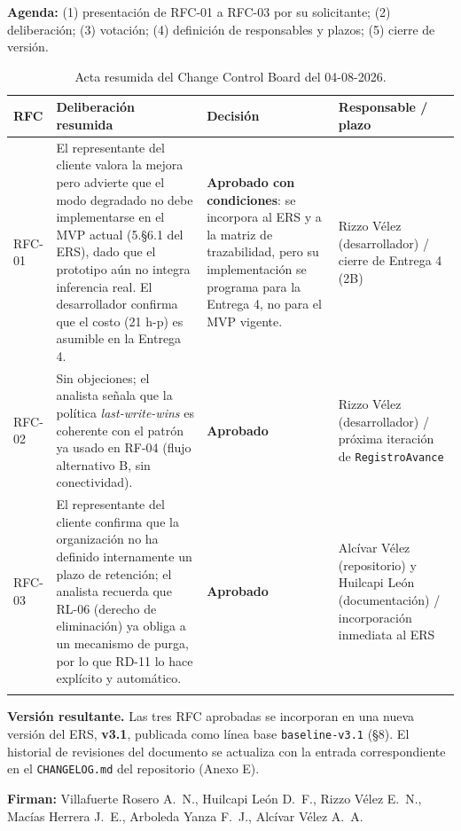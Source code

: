 \documentclass[11pt,a4paper]{article}
\begin{document}
\noindent\textbf{Agenda:} (1) presentación de RFC-01 a RFC-03 por su solicitante; (2)
deliberación; (3) votación; (4) definición de responsables y plazos; (5) cierre de versión.

\begin{longtable}{p{1.6cm}p{5.7cm}p{2.4cm}p{4cm}}
\toprule
\textbf{RFC} & \textbf{Deliberación resumida} & \textbf{Decisión} & \textbf{Responsable / plazo} \\
\midrule
\endhead
RFC-01 & El representante del cliente valora la mejora pero advierte que el modo degradado no debe implementarse en el MVP actual (5.\S6.1 del ERS), dado que el prototipo aún no integra inferencia real. El desarrollador confirma que el costo (21 h-p) es asumible en la Entrega 4. & \textbf{Aprobado con condiciones}: se incorpora al ERS y a la matriz de trazabilidad, pero su implementación se programa para la Entrega 4, no para el MVP vigente. & Rizzo Vélez (desarrollador) / cierre de Entrega 4 (2B) \\
RFC-02 & Sin objeciones; el analista señala que la política \emph{last-write-wins} es coherente con el patrón ya usado en RF-04 (flujo alternativo B, sin conectividad). & \textbf{Aprobado} & Rizzo Vélez (desarrollador) / próxima iteración de \texttt{RegistroAvance} \\
RFC-03 & El representante del cliente confirma que la organización no ha definido internamente un plazo de retención; el analista recuerda que RL-06 (derecho de eliminación) ya obliga a un mecanismo de purga, por lo que RD-11 lo hace explícito y automático. & \textbf{Aprobado} & Alcívar Vélez (repositorio) y Huilcapi León (documentación) / incorporación inmediata al ERS \\
\bottomrule
\caption{Acta resumida del Change Control Board del 04-08-2026.}
\end{longtable}

\noindent\textbf{Versión resultante.} Las tres RFC aprobadas se incorporan en una nueva versión
del ERS, \textbf{v3.1}, publicada como línea base \texttt{baseline-v3.1} (\S8). El historial de
revisiones del documento se actualiza con la entrada correspondiente en el
\texttt{CHANGELOG.md} del repositorio (Anexo E).

\noindent\textbf{Firman:} Villafuerte Rosero A.\ N., Huilcapi León D.\ F., Rizzo Vélez E.\ N.,
Macías Herrera J.\ E., Arboleda Yanza F.\ J., Alcívar Vélez A.\ A.

\end{document}
